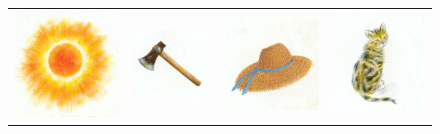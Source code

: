 \documentclass[output=paper,newtxmath,modfonts,nonflat,draftmode]{langsci/langscibook}
\begin{document}
\begin{figure}[H]
\begin{tabularx}{\textwidth}{XXXX}
\includegraphics[width=.2\textwidth]{figures/takam-img9.png}  &
\includegraphics[width=.2\textwidth]{figures/takam-img10.png} & 
\includegraphics[width=.2\textwidth]{figures/takam-img11.png}  & 
\includegraphics[width=.2\textwidth]{figures/takam-img12.png}\\
\end{tabularx}
\end{figure}
\end{document}
